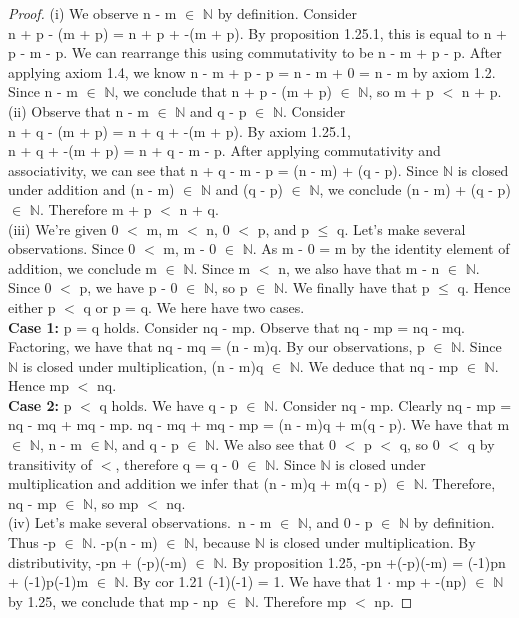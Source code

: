 \documentclass[12pt]{amsart}
\newcommand{\N}{\mathbb{N}}
\begin{document}
\begin{proof}
(i) We observe n - m $\in$ $\N$ by definition. Consider \\n + p - (m + p) = n + p + -(m + p). By proposition 1.25.1, this is equal to n + p - m - p. We can rearrange this using commutativity to be n - m + p - p. After applying axiom 1.4, we know n - m + p - p = n - m + 0 = n - m by axiom 1.2. Since n - m $\in$ $\N$, we conclude that n + p - (m + p) $\in$ $\N$, so m + p $<$ n + p.
\\\indent(ii) Observe that n - m $\in$ $\N$ and q - p $\in$ $\N$. Consider \\n + q - (m + p) = n + q + -(m + p). By axiom 1.25.1, \\n + q + -(m + p) = n + q  - m - p. After applying commutativity and associativity, we can see that n + q  - m - p = (n - m) + (q - p). Since $\N$ is closed under addition and (n - m) $\in$ $\N$ and (q - p) $\in$ $\N$, we conclude (n - m) + (q - p) $\in$ $\N$. Therefore m + p $<$ n + q.
\\\indent(iii) We're given 0 $<$ m, m $<$ n, 0 $<$ p, and p $\leq$ q. Let's make several observations. Since 0 $<$ m, m - 0 $\in$ $\N$. As m - 0 = m by the identity element of addition, we conclude m $\in$ $\N$. Since m $<$ n, we also have that m - n $\in$ $\N$. Since 0 $<$ p, we have p - 0 $\in$ $\N$, so p $\in$ $\N$. We finally have that p $\leq$ q. Hence either p $<$ q or p = q. We here have two cases.
\\\textbf{Case 1:} p = q holds. Consider nq - mp. Observe that nq - mp = nq - mq. Factoring, we have that nq - mq = (n - m)q. By our observations, p $\in$ $\N$. Since $\N$ is closed under multiplication, (n - m)q $\in$ $\N$. We deduce that nq - mp $\in$ $\N$. Hence mp $<$ nq.
\\\textbf{Case 2:} p $<$ q holds. We have q - p $\in$ $\N$. Consider nq - mp. Clearly nq - mp = nq - mq + mq - mp. nq - mq + mq - mp = (n - m)q + m(q - p). We have that m $\in$ $\N$, n - m $\in$$\N$, and q - p $\in$ $\N$. We also see that 0 $<$ p $<$ q, so 0 $<$ q by transitivity of $<$, therefore q = q - 0 $\in$ $\N$. Since $\N$ is closed under multiplication and addition we infer that (n - m)q + m(q - p) $\in$ $\N$. Therefore, nq - mp $\in$ $\N$, so mp $<$ nq.
\\(iv) Let's make several observations.\ n - m $\in$ $\N$, and 0 - p $\in$ $\N$ by definition. Thus -p $\in$ $\N$. -p(n - m) $\in$ $\N$, because $\N$ is closed under multiplication. By distributivity, -pn + (-p)(-m) $\in$ $\N$. By proposition 1.25, -pn +(-p)(-m) = (-1)pn + (-1)p(-1)m $\in$ $\N$. By cor 1.21 (-1)(-1) = 1. We have that 1 $\cdot$ mp + -(np) $\in$ $\N$ by 1.25, we conclude that mp - np $\in$ $\N$. Therefore mp $<$ np.
\end{proof}
\end{document}
